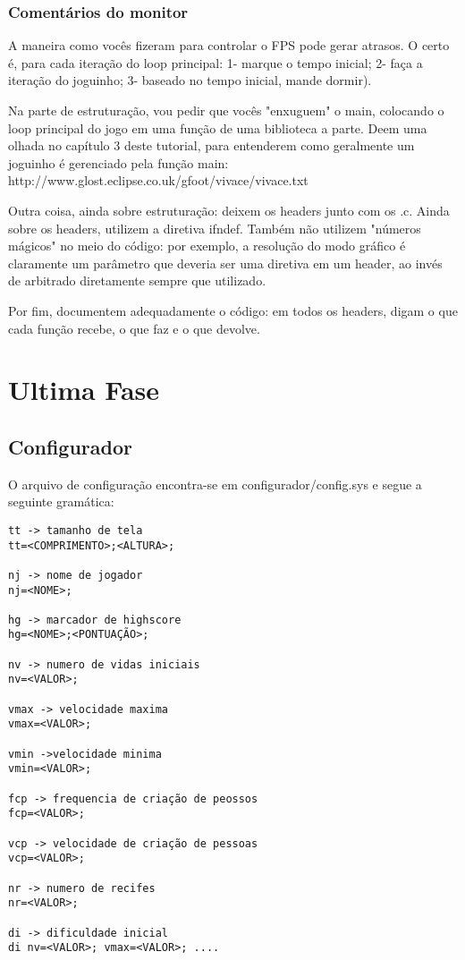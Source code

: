 \documentclass[a4paper,12pt]{article}
\begin{document}
\subsubsection{Coment\'arios do monitor}
A maneira como vocês fizeram para controlar o FPS pode gerar atrasos. O certo é, para cada iteração do loop principal: 1- marque o tempo inicial; 2- faça a iteração do joguinho; 3- baseado no tempo inicial, mande dormir).

Na parte de estruturação, vou pedir que vocês "enxuguem" o main, colocando o loop principal do jogo em uma função de uma biblioteca a parte. Deem uma olhada no capítulo 3 deste tutorial, para entenderem como geralmente um joguinho é gerenciado pela função main: http://www.glost.eclipse.co.uk/gfoot/vivace/vivace.txt

Outra coisa, ainda sobre estruturação: deixem os headers junto com os .c. Ainda sobre os headers, utilizem a diretiva ifndef. Também não utilizem "números mágicos" no meio do código: por exemplo, a resolução do modo gráfico é claramente um parâmetro que deveria ser uma diretiva em um header, ao invés de arbitrado diretamente sempre que utilizado.

Por fim, documentem adequadamente o código: em todos os headers, digam o que cada função recebe, o que faz e o que devolve.

\section{Ultima Fase}
\subsection{Configurador}
O arquivo de configura\c c\~ao encontra-se em configurador/config.sys e segue a seguinte gram\'atica:

\begin{verbatim}
tt -> tamanho de tela
tt=<COMPRIMENTO>;<ALTURA>;

nj -> nome de jogador
nj=<NOME>;

hg -> marcador de highscore
hg=<NOME>;<PONTUAÇÃO>;

nv -> numero de vidas iniciais
nv=<VALOR>;

vmax -> velocidade maxima
vmax=<VALOR>;

vmin ->velocidade minima
vmin=<VALOR>;

fcp -> frequencia de criação de peossos
fcp=<VALOR>;

vcp -> velocidade de criação de pessoas
vcp=<VALOR>;

nr -> numero de recifes
nr=<VALOR>;

di -> dificuldade inicial
di nv=<VALOR>; vmax=<VALOR>; .... 
\end{verbatim}
\end{document}
